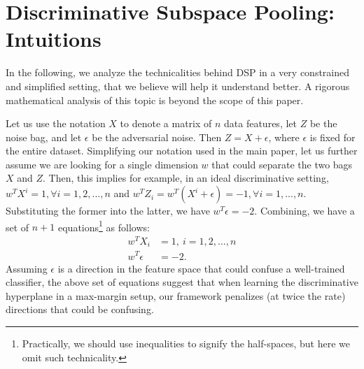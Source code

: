 \documentclass[runningheads]{llncs}
\renewcommand\cdots{...}
\begin{document}




\author{Jue Wang\and
Anoop Cherian}



\maketitle


\section{Discriminative Subspace Pooling: Intuitions}
In the following, we analyze the technicalities behind DSP in a very constrained and simplified setting, that we believe will help it understand better. A rigorous mathematical analysis of this topic is beyond the scope of this paper.

Let us use the notation $X$ to denote a matrix of $n$ data features, let $Z$ be the noise bag, and let $\epsilon$ be the adversarial noise. Then $Z=X+\epsilon$, where $\epsilon$ is fixed for the entire dataset. Simplifying our notation used in the main paper, let us further assume we are looking for a single dimension $w$ that could separate the two bags $X$ and $Z$. Then, this implies for example, in an ideal discriminative setting, $w^TX^i=1, \forall i=1,2,\cdots ,n$ and $w^TZ_i = w^T(X^i+\epsilon) = -1, \forall i=1,\cdots, n$. Substituting the former into the latter, we have $w^T\epsilon = -2$. Combining, we have a set of $n+1$ equations\footnote{Practically, we should use inequalities to signify the half-spaces, but here we omit such technicality.} as follows:
\begin{align}
\label{eq:hype_1}
w^TX_i &= 1,\ i=1,2,\cdots, n\\
w^T\epsilon &= -2.
\label{eq:hype_2}
\end{align}
Assuming $\epsilon$ is a direction in the feature space that could confuse a well-trained classifier, the above set of equations suggest that when learning the discriminative hyperplane in a max-margin setup, our framework penalizes (at twice the rate) directions that could be confusing.
\end{document}
